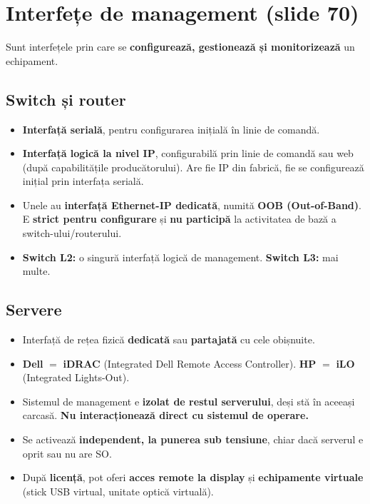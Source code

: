 \documentclass[11pt,a4paper]{article}
\begin{document}
\section{Interfețe de management (slide 70)}
Sunt interfețele prin care se \textbf{configurează, gestionează și monitorizează} un echipament.

\subsection*{Switch și router}
\begin{itemize}
  \item \textbf{Interfață serială}, pentru configurarea inițială în linie de comandă.
  \item \textbf{Interfață logică la nivel IP}, configurabilă prin linie de comandă sau web (după capabilitățile producătorului). Are fie IP din fabrică, fie se configurează inițial prin interfața serială.
  \item Unele au \textbf{interfață Ethernet-IP dedicată}, numită \textbf{OOB (Out-of-Band)}. E \textbf{strict pentru configurare} și \textbf{nu participă} la activitatea de bază a switch-ului/routerului.
  \item \textbf{Switch L2:} o singură interfață logică de management. \textbf{Switch L3:} mai multe.
\end{itemize}

\subsection*{Servere}
\begin{itemize}
  \item Interfață de rețea fizică \textbf{dedicată} sau \textbf{partajată} cu cele obișnuite.
  \item \textbf{Dell} $=$ \textbf{iDRAC} (Integrated Dell Remote Access Controller). \textbf{HP} $=$ \textbf{iLO} (Integrated Lights-Out).
  \item Sistemul de management e \textbf{izolat de restul serverului}, deși stă în aceeași carcasă. \textbf{Nu interacționează direct cu sistemul de operare.}
  \item Se activează \textbf{independent, la punerea sub tensiune}, chiar dacă serverul e oprit sau nu are SO.
  \item După \textbf{licență}, pot oferi \textbf{acces remote la display} și \textbf{echipamente virtuale} (stick USB virtual, unitate optică virtuală).
\end{itemize}
\end{document}
